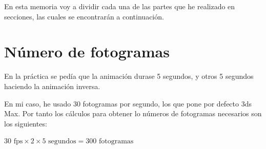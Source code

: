 \documentclass{article}
\begin{document}
En esta memoria voy a dividir cada una de las partes que he realizado en secciones, las cuales se encontrarán a continuación.

\section{Número de fotogramas}

En la práctica se pedía que la animación durase 5 segundos, y otros 5 segundos haciendo la animación inversa. 

En mi caso, he usado 30 fotogramas por segundo, los que pone por defecto 3ds Max. Por tanto los cálculos para obtener lo números de fotogramas necesarios son los siguientes:


$30 \text{ fps} \times 2 \times 5 \text{ segundos} = 300 \text{ fotogramas} $
\end{document}
